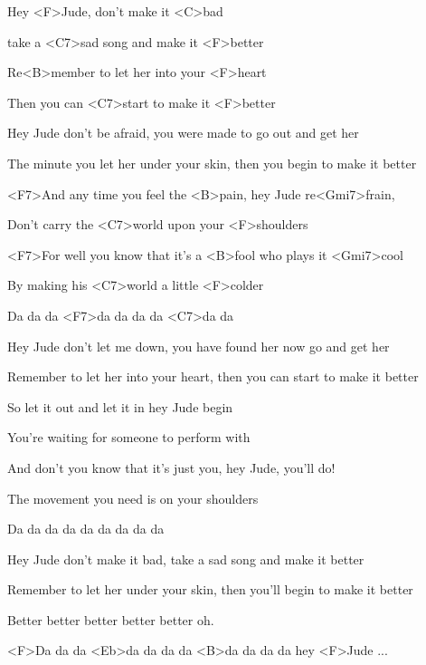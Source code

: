 

\zs
Hey <F>Jude, don't make it <C>bad

take a <C7>sad song and make it <F>better

Re<B>member to let her into your <F>heart

Then you can <C7>start to make it <F>better
\ks

\zs
Hey Jude don't be afraid,
you were made to go out and get her

The minute you let her under your skin,
then you begin to make it better
\ks

\zr
<F7>And any time you feel the <B>pain, hey Jude re<Gmi7>frain,

Don't carry the <C7>world upon your <F>shoulders

<F7>For well you know that it's a <B>fool who plays it <Gmi7>cool

By making his <C7>world a little <F>colder

Da da da <F7>da da da da <C7>da da
\kr

\zs
Hey Jude don't let me down,
you have found her now go and get her

Remember to let her into your heart,
then you can start to make it better
\ks

\zr
So let it out and let it in hey Jude begin

You're waiting for someone to perform with

And don't you know that it's just you, hey Jude, you'll do!

The movement you need is on your shoulders

Da da da da da da da da da
\kr

\zs
Hey Jude don't make it bad,
take a sad song and make it better

Remember to let her under your skin,
then you'll begin to make it better

Better better better better better oh.
\ks

<F>Da da da <Eb>da da da da <B>da da da da hey <F>Jude ...

\kp

